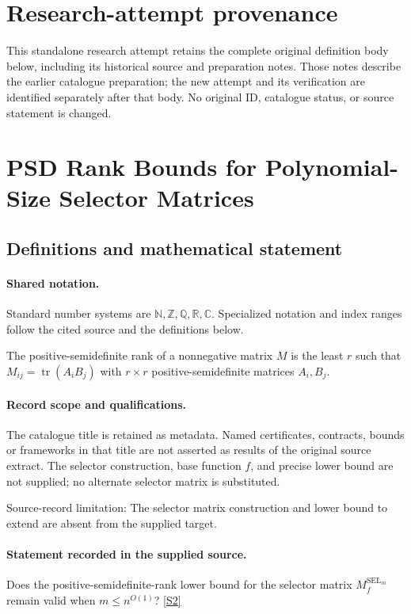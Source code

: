 \documentclass[11pt]{article}
\begin{document}
\section*{Research-attempt provenance}
This standalone research attempt retains the complete original definition body below,
including its historical source and preparation notes. Those notes describe the
earlier catalogue preparation; the new attempt and its verification are identified
separately after that body. No original ID, catalogue status, or source statement is changed.

\section{PSD Rank Bounds for Polynomial-Size Selector Matrices}\label{statement}

\subsection{Definitions and mathematical statement}

\paragraph{Shared notation.}Standard number systems are $\mathbb N,\mathbb Z,\mathbb Q,\mathbb R,\mathbb C$. Specialized notation and index ranges follow the cited source and the definitions below.


The positive-semidefinite rank of a nonnegative matrix $M$ is the least $r$ such that $M_{ij}=\operatorname{tr}(A_iB_j)$ with $r\times r$ positive-semidefinite matrices $A_i,B_j$.
\paragraph{Record scope and qualifications.}
The catalogue title is retained as metadata. Named certificates, contracts, bounds or frameworks in that title are not asserted as results of the original source extract.
The selector construction, base function $f$, and precise lower bound are not supplied; no alternate selector matrix is substituted.

Source-record limitation: The selector matrix construction and lower bound to extend are absent from the supplied target.
\paragraph{Statement recorded in the supplied source.}
Does the positive-semidefinite-rank lower bound for the selector matrix $M_f^{\operatorname{SEL}_m}$ remain valid when $m\leq n^{O(1)}$? \href{https://doi.org/10.4171/owr/2017/37}{[S2]}
\end{document}
